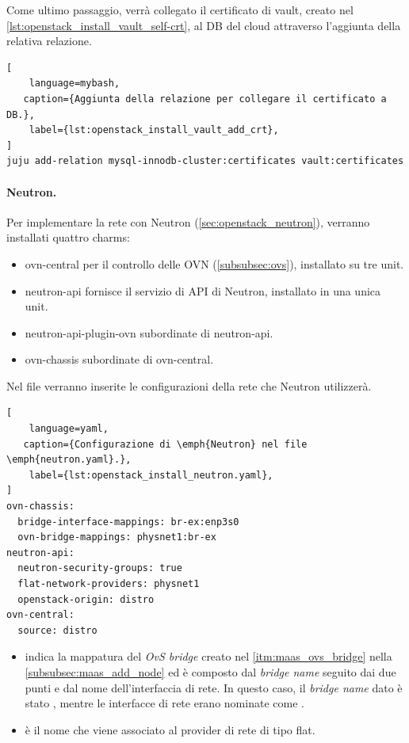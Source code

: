 \bigskip\noindent
Come ultimo passaggio, verrà collegato il certificato di vault, creato nel \cref{lst:openstack_install_vault_self-crt}, al DB del cloud attraverso l'aggiunta della relativa relazione.
\begin{lstlisting}[
    language=mybash, 
   caption={Aggiunta della relazione per collegare il certificato a DB.},
    label={lst:openstack_install_vault_add_crt},
]
juju add-relation mysql-innodb-cluster:certificates vault:certificates
\end{lstlisting}



\paragraph{Neutron.}
Per implementare la rete con Neutron (\cref{sec:openstack_neutron}), verranno installati quattro charms:
% 
\begin{itemize}
    \item ovn-central per il controllo delle OVN (\cref{subsubsec:ovs}), installato su tre unit.
    \item neutron-api fornisce il servizio di API di Neutron, installato in una unica unit.
    \item neutron-api-plugin-ovn subordinate di neutron-api.
    \item ovn-chassis subordinate di ovn-central.
\end{itemize}
% 
Nel file  verranno inserite le configurazioni della rete che Neutron utilizzerà.
\begin{lstlisting}[
    language=yaml, 
   caption={Configurazione di \emph{Neutron} nel file \emph{neutron.yaml}.},
    label={lst:openstack_install_neutron.yaml},
]
ovn-chassis:
  bridge-interface-mappings: br-ex:enp3s0
  ovn-bridge-mappings: physnet1:br-ex
neutron-api:
  neutron-security-groups: true
  flat-network-providers: physnet1
  openstack-origin: distro
ovn-central:
  source: distro
\end{lstlisting}
\begin{itemize}
    \item {} indica la mappatura del \emph{OvS bridge} creato nel \cref{itm:maas_ovs_bridge} nella \cref{subsubsec:maas_add_node} ed è composto dal \emph{bridge name}  seguito dai due punti e dal nome dell'interfaccia di rete.
    In questo caso, il \emph{bridge name} dato è stato , mentre le interfacce di rete erano nominate come .
    
    \item {} è il nome che viene associato al provider di rete di tipo flat.
\end{itemize}



